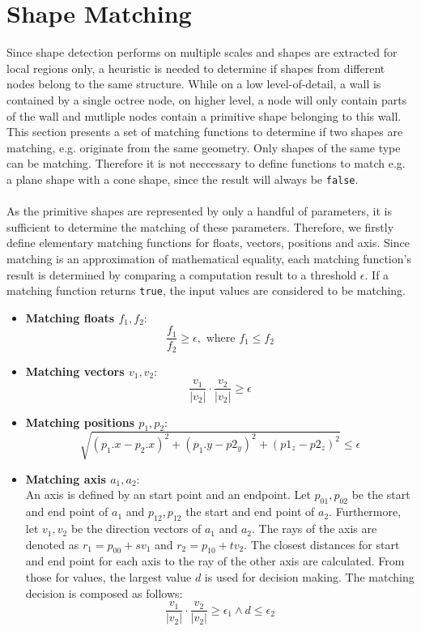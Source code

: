 \section{Shape Matching}
\label{sec:shapeMatching}
Since shape detection performs on multiple scales and shapes are extracted for local regions only, a heuristic is needed to determine if shapes from different nodes belong to the same structure. While on a low level-of-detail, a wall is contained by a single octree node, on higher level, a node will only contain parts of the wall and mutliple nodes contain a primitive shape belonging to this wall. This section presents a set of matching functions to determine if two shapes are matching, e.g. originate from the same geometry. Only shapes of the same type can be matching.  Therefore it is not neccessary to define functions to match e.g. a plane shape with a cone shape, since the result will always be \verb|false|. 
\\
\\
As the primitive shapes are represented by only a handful of parameters, it is sufficient to determine the matching of these parameters.  Therefore, we firstly define elementary matching functions for floats, vectors, positions and axis. Since matching is an approximation of mathematical equality, each matching function's result is determined by comparing a computation result to a threshold $\epsilon$. If a matching function returns \verb|true|, the input values are considered to be matching. 

\begin{itemize}
	\item \textbf{Matching floats $f_1, f_2$}: 
		$$\frac{f_1}{f_2} \geq \epsilon, \textrm{ where } f_1 \leq f_2$$  
	\item \textbf{Matching vectors $v_1, v_2$}: 
		$$\frac{v_1}{|v_2|} \cdot \frac{v_2}{|v_2|} \geq \epsilon$$
	\item \textbf{Matching positions $p_1, p_2$}: 
		$$\sqrt{(p_1.x - p_2.x)^2 + (p_1.y - p2_y)^2 + (p1_z - p2_z)^2} \leq \epsilon$$
	\item \textbf{Matching axis $a_1, a_2$}: 
	\\
	An axis is defined by an start point and an endpoint. Let $p_{01},p_{02}$ be the start and end point of $a_1$ and $p_{12}, p_{12}$ the start and end point of $a_2$. Furthermore, let $v_1, v_2$ be the direction vectors of $a_1$ and $a_2$. The rays of the axis are denoted as $r_1 = p_{00} + sv_1$ and $r_2 = p_{10} + tv_2$. The closest distances for start and end point for each axis to the ray of the other axis are calculated. From those for values, the largest value $d$ is used for decision making. The matching decision is composed as follows: 
		$$\frac{v_1}{|v_2|} \cdot \frac{v_2}{|v_2|} \geq \epsilon_1 \land d \leq \epsilon_2$$
\end{itemize}


